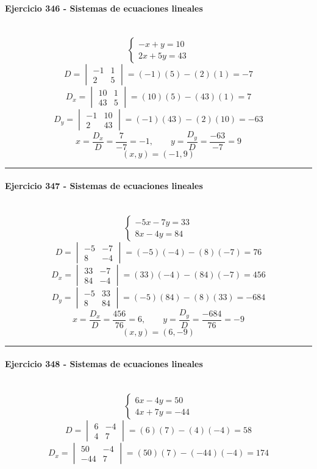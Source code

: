 \documentclass[10pt,a4paper]{article}
\newcommand{\res}[1]{\paragraph{#1}\mbox{}\\[-1.2em]}
\begin{document}
\res{Ejercicio 346 - Sistemas de ecuaciones lineales}
\[ \begin{cases}- x + y=10\\2 x + 5 y=43\end{cases} \]
\[ D=\begin{vmatrix}-1&1\\2&5\end{vmatrix}=(-1)(5)-(2)(1)=-7 \]
\[ D_x=\begin{vmatrix}10&1\\43&5\end{vmatrix}=(10)(5)-(43)(1)=7 \]
\[ D_y=\begin{vmatrix}-1&10\\2&43\end{vmatrix}=(-1)(43)-(2)(10)=-63 \]
\[ x=\frac{D_x}{D}=\frac{7}{-7}=-1,\qquad y=\frac{D_y}{D}=\frac{-63}{-7}=9 \]
\[ \boxed{(x,y)=(-1,9)} \]
\vspace{1mm}\hrule\vspace{2mm}
\res{Ejercicio 347 - Sistemas de ecuaciones lineales}
\[ \begin{cases}- 5 x - 7 y=33\\8 x - 4 y=84\end{cases} \]
\[ D=\begin{vmatrix}-5&-7\\8&-4\end{vmatrix}=(-5)(-4)-(8)(-7)=76 \]
\[ D_x=\begin{vmatrix}33&-7\\84&-4\end{vmatrix}=(33)(-4)-(84)(-7)=456 \]
\[ D_y=\begin{vmatrix}-5&33\\8&84\end{vmatrix}=(-5)(84)-(8)(33)=-684 \]
\[ x=\frac{D_x}{D}=\frac{456}{76}=6,\qquad y=\frac{D_y}{D}=\frac{-684}{76}=-9 \]
\[ \boxed{(x,y)=(6,-9)} \]
\vspace{1mm}\hrule\vspace{2mm}
\res{Ejercicio 348 - Sistemas de ecuaciones lineales}
\[ \begin{cases}6 x - 4 y=50\\4 x + 7 y=-44\end{cases} \]
\[ D=\begin{vmatrix}6&-4\\4&7\end{vmatrix}=(6)(7)-(4)(-4)=58 \]
\[ D_x=\begin{vmatrix}50&-4\\-44&7\end{vmatrix}=(50)(7)-(-44)(-4)=174 \]
\end{document}
